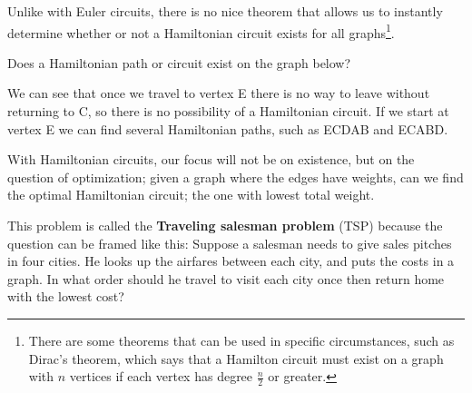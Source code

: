 Unlike with Euler circuits, there is no nice theorem that allows us to instantly determine whether or not a Hamiltonian circuit exists for all graphs\footnote{There are some theorems that can be used in specific circumstances, such as Dirac's theorem, which says that a Hamilton circuit must exist on a graph with $n$ vertices if each vertex has degree $\frac{n}{2}$ or greater.}.  

\begin{example}{}{} %
Does a Hamiltonian path or circuit exist on the graph below?\\


We can see that once we travel to vertex E there is no way to leave without returning to C, so there is no possibility of a Hamiltonian circuit.  If we start at vertex E we can find several Hamiltonian paths, such as ECDAB and ECABD.
\end{example}

With Hamiltonian circuits, our focus will not be on existence, but on the question of optimization; given a graph where the edges have weights, can we find the optimal Hamiltonian circuit; the one with lowest total weight.\\
\begin{minipage}{0.5\textwidth}
This problem is called the \textbf{Traveling salesman problem} (TSP) because the question can be framed like this:  Suppose a salesman needs to give sales pitches in four cities.  He looks up the airfares between each city, and puts the costs in a graph.  In what order should he travel to visit each city once then return home with the lowest cost? 
\end{minipage}
%
\begin{minipage}{0.5\textwidth}
\end{minipage}

